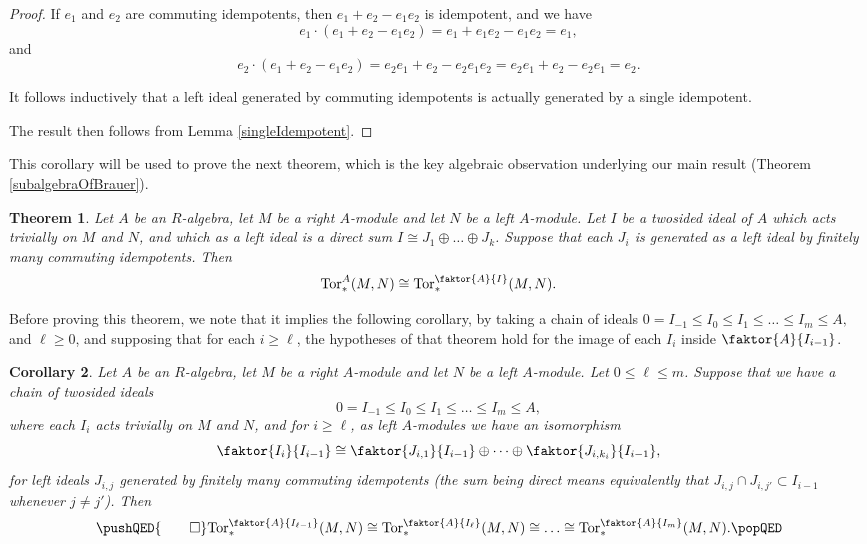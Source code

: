 \documentclass[12pt]{amsart}
\theoremstyle{plain}
\newtheorem{theorem}{Theorem}[section]
\theoremstyle{definition} \newtheorem{definition}[theorem]{Definition}
\theoremstyle{plain}
\theoremstyle{plain} \newtheorem{proposition}[theorem]{Proposition}
\theoremstyle{plain} \newtheorem{conjecture}[theorem]{Conjecture}
\theoremstyle{plain} \newtheorem{corollary}[theorem]{Corollary}
\theoremstyle{remark} \newtheorem{claim}[theorem]{Claim}
\theoremstyle{remark} \newtheorem{remark}[theorem]{Remark}
\theoremstyle{remark} \newtheorem{example}[theorem]{Example}
\theoremstyle{remark} \newtheorem{comment}[theorem]{Comment}
\theoremstyle{definition} \newtheorem{question}[theorem]{Question}
\newcommand{\Tor}{\mathrm{Tor}}
\begin{document}
\begin{proof}  If $e_1$ and $e_2$ are commuting idempotents, then $e_1 + e_2 - e_1e_2$ is idempotent, and we have $$e_1 \cdot(e_1 + e_2 - e_1e_2) = e_1 + e_1 e_2 - e_1 e_2 = e_1,$$ and $$e_2 \cdot(e_1 + e_2 - e_1e_2) = e_2 e_1 + e_2 - e_2 e_1 e_2 = e_2 e_1 + e_2 - e_2 e_1 = e_2.$$

It follows inductively that a left ideal generated by commuting idempotents is actually generated by a single idempotent.

The result then follows from Lemma \ref{singleIdempotent}. \end{proof}

This corollary will be used to prove the next theorem, which is the key algebraic observation underlying our main result (Theorem \ref{subalgebraOfBrauer}).

\begin{theorem} \label{quotientingPlus} Let $A$ be an $R$-algebra, let $M$ be a right $A$-module and let $N$ be a left $A$-module. Let $I$ be a twosided ideal of $A$ which acts trivially on $M$ and $N$, and which as a left ideal is a direct sum $I \cong J_1 \oplus \dots \oplus J_k$. Suppose that each $J_i$ is generated as a left ideal by finitely many commuting idempotents. Then $$\Tor^A_*(M,N) \cong \Tor^{\faktor{A}{I}}_*(M,N).$$ \end{theorem}

Before proving this theorem, we note that it implies the following corollary, by taking a chain of ideals $0 = I_{-1} \leq I_0 \leq I_1 \leq \dots \leq I_m \leq A,$ and $\ell \geq 0$, and supposing that for each $i \geq \ell$, the hypotheses of that theorem hold for the image of each $I_i$ inside $\faktor{A}{I_{i-1}}$.

\begin{corollary} \label{quotientingInductively} Let $A$ be an $R$-algebra, let $M$ be a right $A$-module and let $N$ be a left $A$-module. Let $0 \leq \ell \leq m$. Suppose that we have a chain of twosided ideals $$0=I_{-1} \leq I_0 \leq I_1 \leq \dots \leq I_m \leq A,$$ where each $I_i$ acts trivially on $M$ and $N$, and for $i \geq \ell$, as left $A$-modules we have an isomorphism $$\faktor{I_i}{I_{i-1}} \cong \faktor{J_{i,1}}{I_{i-1}} \oplus \dots \oplus \faktor{J_{i,k_i}}{I_{i-1}},$$ for left ideals $J_{i,j}$ generated by finitely many commuting idempotents (the sum being direct means equivalently that $J_{i,j} \cap J_{i,j'} \subset I_{i-1}$ whenever $j \neq j'$). Then \[\pushQED{\qed} 
\Tor^{\faktor{A}{I_{\ell-1}}}_*(M,N) \cong \Tor^{\faktor{A}{I_\ell}}_*(M,N) \cong \dots \cong \Tor^{\faktor{A}{I_m}}_*(M,N). \qedhere
\popQED
\]\end{corollary}
\end{document}
